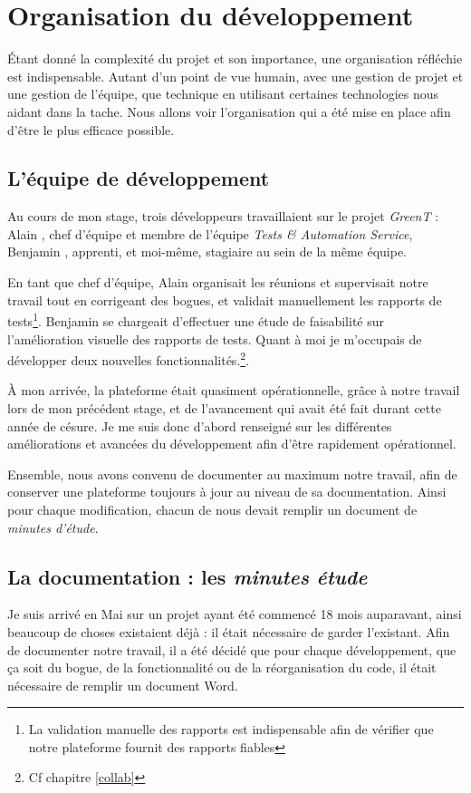 \chapter{Organisation du développement}\label{chapOrganization}
\putminitoc \'Etant donné la complexité du projet et son importance, une organisation réfléchie est indispensable. Autant d'un point de vue humain, avec une gestion de projet et une gestion de l'équipe, que technique en utilisant certaines technologies nous aidant dans la tache.  Nous allons voir l'organisation qui a été mise en place afin d'être le plus efficace possible.

\section{L'équipe de développement}
Au cours de mon stage, trois développeurs travaillaient sur le projet \textit{GreenT} : Alain , chef d’équipe et membre de
l’équipe \textit{Tests \& Automation Service}, Benjamin , apprenti, et moi-même, stagiaire au sein de la même équipe.

En tant que chef d’équipe, Alain  organisait les réunions et supervisait notre travail tout en corrigeant des bogues, et validait manuellement les rapports de tests\footnote{La validation manuelle des rapports est indispensable afin de vérifier que notre plateforme fournit des rapports fiables}. Benjamin  se chargeait d'effectuer une étude de faisabilité sur l'amélioration visuelle des rapports de tests. Quant à moi je m'occupais de développer deux nouvelles fonctionnalités.\footnote{Cf chapitre \ref{collab}}.


À mon arrivée, la plateforme était quasiment opérationnelle, grâce à notre travail lors de mon précédent stage, et de l'avancement qui avait été fait durant cette année de césure. Je me suis donc d'abord renseigné sur les différentes améliorations et avancées du développement afin d'être rapidement opérationnel.  

Ensemble, nous avons convenu de documenter au maximum notre travail, afin de conserver une plateforme toujours à jour au niveau de sa documentation. Ainsi pour chaque modification, chacun de nous devait remplir un document de \textit{minutes d'étude}.

\section{La documentation : les \textit{minutes étude}}
Je suis arrivé en Mai sur un projet ayant été commencé 18 mois auparavant, ainsi beaucoup de choses existaient déjà : il était nécessaire de
garder l'existant. Afin de documenter notre travail, il a été décidé que pour chaque développement, que ça soit du bogue, de la fonctionnalité ou de la réorganisation du code, il était nécessaire de remplir un document Word.

